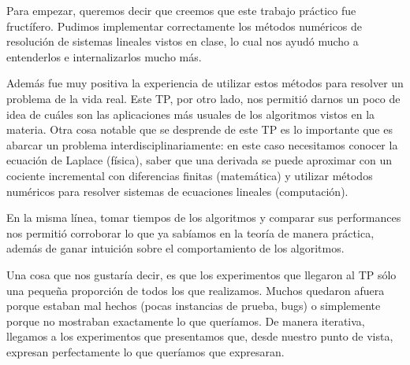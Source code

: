 Para empezar, queremos decir que creemos que este trabajo práctico fue fructífero. Pudimos implementar correctamente los métodos numéricos de resolución de sistemas lineales vistos en clase, lo cual nos ayudó mucho a entenderlos e internalizarlos mucho más.

Además fue muy positiva la experiencia de utilizar estos métodos para resolver un problema de la vida real. Este TP, por otro lado, nos permitió darnos un poco de idea de cuáles son las aplicaciones más usuales de los algoritmos vistos en la materia. Otra cosa notable que se desprende de este TP es lo importante que es abarcar un problema interdisciplinariamente: en este caso necesitamos conocer la ecuación de Laplace (física), saber que una derivada se puede aproximar con un cociente incremental con diferencias finitas (matemática) y utilizar métodos numéricos para resolver sistemas de ecuaciones lineales (computación).

En la misma línea, tomar tiempos de los algoritmos y comparar sus performances nos permitió corroborar lo que ya sabíamos en la teoría de manera práctica, además de ganar intuición sobre el comportamiento de los algoritmos.

Una cosa que nos gustaría decir, es que los experimentos que llegaron al TP sólo una pequeña proporción de todos los que realizamos. Muchos quedaron afuera porque estaban mal hechos (pocas instancias de prueba, bugs) o simplemente porque no mostraban exactamente lo que queríamos. De manera iterativa, llegamos a los experimentos que presentamos que, desde nuestro punto de vista, expresan perfectamente lo que queríamos que expresaran.

